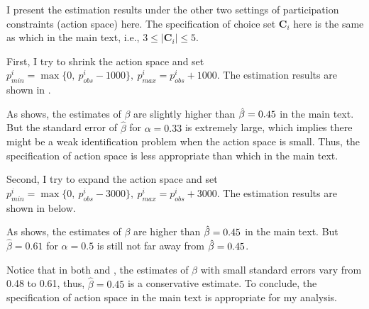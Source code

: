 I present the estimation results under the other two settings of
participation constraints (action space) here.
The specification of choice set $\mathbf{C}_i$ here is the same as which in the main text, i.e.,
$3 \leq |\mathbf{C}_i| \leq 5$.

First, I try to shrink the action space and set
$p^{i}_{min} = \max\{0, ~p^{i}_{obs}-1000\}, ~ p^{i}_{max} = p^{i}_{obs} + 1000$.
The estimation results are shown in .

As  shows, the estimates of $\beta$
are slightly higher than $\hat{\beta} = 0.45$ in the main text. But the standard error of $\hat{\beta}$ for
$\alpha = 0.33$ is extremely large, which implies there might be a weak identification problem
when the action space is small. Thus, the specification of action space is less appropriate than
which in the main text.

Second, I try to expand the action space and set
$p^{i}_{min} = \max\{0, ~p^{i}_{obs}-3000\}, ~ p^{i}_{max} = p^{i}_{obs} + 3000$.
The estimation results are shown in 
below.



As  shows, the estimates of
$\beta$ are higher than $\hat{\beta} = 0.45$ in the main text. But $\hat{\beta} = 0.61$ for $\alpha=0.5$ is still not far away
from $\hat{\beta} = 0.45$.

Notice that in both
and
,
the estimates of $\beta$ with small standard errors vary from 0.48 to 0.61, thus, $\hat{\beta} = 0.45$ is a conservative estimate.
To conclude, the specification of action space in the main text is appropriate for
my analysis.